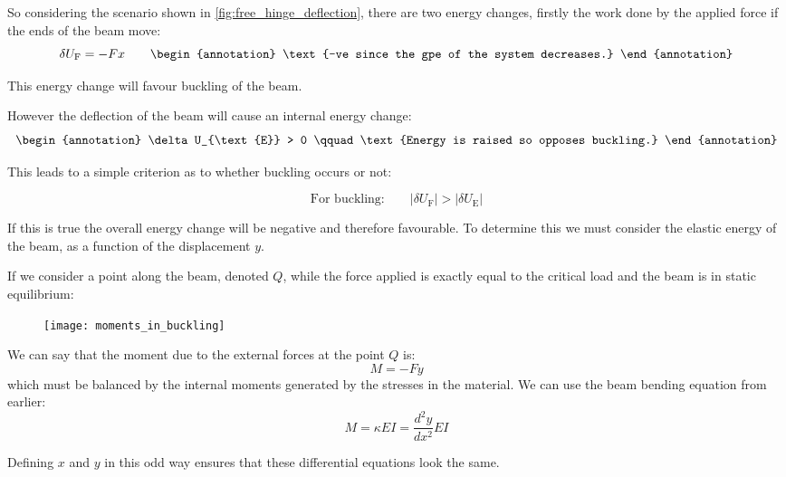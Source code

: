 So considering the scenario shown in \autoref{fig:free_hinge_deflection}, there are two energy changes, firstly the work done by the applied force if the ends of the beam move:
\begin{equation}
\delta U_{\text{F}} = -F x \qquad\begin{annotation}
\text{-ve since the gpe of the system decreases.}
\end{annotation}
\end{equation}
\begin{annotation}
This energy change will favour buckling of the beam.
\end{annotation}

However the deflection of the beam will cause an internal energy change:
\begin{equation}
\begin{annotation}
\delta U_{\text{E}} > 0 \qquad \text{Energy is raised so opposes buckling.}
\end{annotation}
\end{equation}

This leads to a simple criterion as to whether buckling occurs or not:

\begin{equation}
\text{For buckling:} \qquad |\delta U_{\text{F}}| > |\delta U_{\text{E}}|
\end{equation}

If this is true the overall energy change will be negative and therefore favourable. To determine this we must consider the elastic energy of the beam, as a function of the displacement $y$.


If we consider a point along the beam, denoted $Q$, while the force applied is exactly equal to the critical load and the beam is in static equilibrium:
\FloatBarrier
\begin{figure}[h!]
\centering
\texttt{[image: moments\_in\_buckling]}
\caption{}
\end{figure}
\FloatBarrier
We can say that the moment due to the external forces at the point $Q$ is:
\begin{equation}
M=-Fy
\end{equation}
which must be balanced by the internal moments generated by the stresses in the material. We can use the beam bending equation from earlier:
\begin{equation}
M=\kappa E I = \frac{d^2y}{dx^2}EI
\end{equation}

\begin{annotation}
Defining $ x$ and $y$ in this odd way ensures that these differential equations look the same.
\end{annotation}

